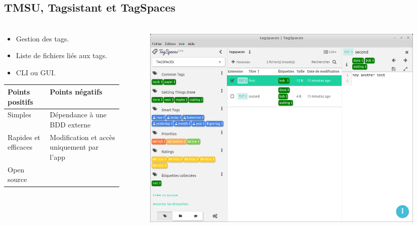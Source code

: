 \documentclass[10pt]{beamer}
\begin{document}
\subsection{TMSU, Tagsistant et TagSpaces}
\begin{frame}
    \frametitle{\subsecname}
    \begin{columns}[T]
        \begin{column}{.35\textwidth}
        \fontsize{8pt}{9}\selectfont
            \begin{center}
                \begin{itemize}
                    \item Gestion des tags.
                    \item Liste de fichiers liés aux tags.
                    \item CLI ou GUI.
                \end{itemize}
                \pause[3]
                \bigbreak
                \begin{tabularx}{4.5cm}{|p{1.8cm}|X|} \hline
                    \textbf{Points positifs} & \textbf{Points négatifs} \\ \hline
                    Simples & Dépendance à une BDD externe \\ \hline
                    Rapides et efficaces & Modification et accès uniquement par l'app \\ \hline
                    Open source & \\ \hline
                \end{tabularx}
            \end{center}
        \end{column}
        \pause[2]
        \begin{column}{.65\textwidth}
            \begin{flushright}
                \begin{figure}
                    \includegraphics[width=0.98\textwidth]{images/tagspaces.png}
                \end{figure}
            \end{flushright}
        \end{column}
    \end{columns}
\end{frame}
\end{document}

